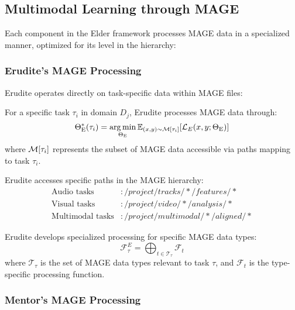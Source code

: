 \subsection{Multimodal Learning through MAGE}

Each component in the Elder framework processes MAGE data in a specialized manner, optimized for its level in the hierarchy:

\subsubsection{Erudite's MAGE Processing}

Erudite operates directly on task-specific data within MAGE files:

\begin{theorem}
For a specific task $\tau_i$ in domain $D_j$, Erudite processes MAGE data through:
\begin{equation}
\Theta_{\text{E}}^{*}(\tau_i) = \mathop{\mathrm{arg\,min}}_{\Theta_{\text{E}}} \mathbb{E}_{(x,y) \sim \mathcal{M}[\tau_i]} [\mathcal{L}_E(x, y; \Theta_{\text{E}})]
\end{equation}
where $\mathcal{M}[\tau_i]$ represents the subset of MAGE data accessible via paths mapping to task $\tau_i$.
\end{theorem}

Erudite accesses specific paths in the MAGE hierarchy:
\begin{align}
\text{Audio tasks} &: /project/tracks/*/features/* \\
\text{Visual tasks} &: /project/video/*/analysis/* \\
\text{Multimodal tasks} &: /project/multimodal/*/aligned/*
\end{align}

\begin{proposition}
Erudite develops specialized processing for specific MAGE data types:
\begin{equation}
\mathcal{F}_{\tau}^E = \bigoplus_{t \in \mathcal{T}_{\tau}} \mathcal{F}_t
\end{equation}
where $\mathcal{T}_{\tau}$ is the set of MAGE data types relevant to task $\tau$, and $\mathcal{F}_t$ is the type-specific processing function.
\end{proposition}

\subsubsection{Mentor's MAGE Processing}

